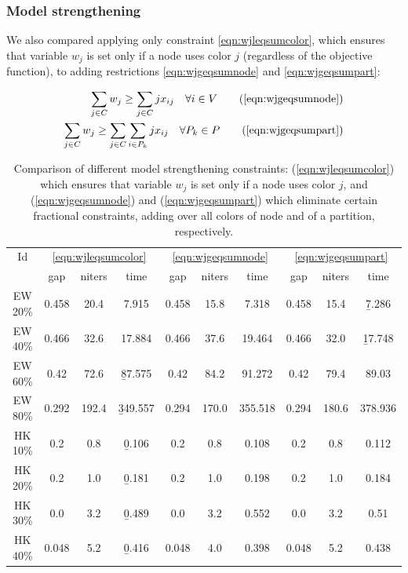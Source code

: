 \subsubsection{Model strengthening}

We also compared applying only constraint \ref{eqn:wjleqsumcolor}, which ensures that variable $w_j$ is set only if a node uses color $j$ (regardless of the objective function), to adding restrictions \ref{eqn:wjgeqsumnode} and \ref{eqn:wjgeqsumpart}:

\begin{align*}
\sum_{j \in C} w_j \geq \sum_{j \in C} j x_{ij} \quad \forall i \in V \tag{\ref{eqn:wjgeqsumnode}} \\
\sum_{j \in C} w_j \geq \sum_{j \in C} \sum_{i \in P_k} j x_{ij} \quad \forall P_k \in P \tag{\ref{eqn:wjgeqsumpart}}
\end{align*}

\begin{table}
\centering

\begin{tabular}{|c|ccc|ccc|ccc|}
\hline
\multicolumn{1}{|c|}{Id} & \multicolumn{3}{|c|}{\ref{eqn:wjleqsumcolor}} & \multicolumn{3}{|c|}{\ref{eqn:wjgeqsumnode}} & \multicolumn{3}{|c|}{\ref{eqn:wjgeqsumpart}}
\\
 & gap & niters & time & gap & niters & time & gap & niters & time
\\
\hline
EW 20\% & 0.458 & 20.4 & 7.915 & 0.458 & 15.8 & 7.318 & 0.458 & 15.4 & \b{7.286}
\\
EW 40\% & 0.466 & 32.6 & 17.884 & 0.466 & 37.6 & 19.464 & 0.466 & 32.0 & \b{17.748}
\\
EW 60\% & 0.42 & 72.6 & \b{87.575} & 0.42 & 84.2 & 91.272 & 0.42 & 79.4 & 89.03
\\
EW 80\% & 0.292 & 192.4 & \b{349.557} & 0.294 & 170.0 & 355.518 & 0.294 & 180.6 & 378.936
\\
\hline
HK 10\% &  0.2 &  0.8 & \b{0.106} &  0.2 &  0.8 & 0.108 &  0.2 &  0.8 & 0.112
\\
HK 20\% &  0.2 &  1.0 & \b{0.181} &  0.2 &  1.0 & 0.198 &  0.2 &  1.0 & 0.184
\\
HK 30\% &  0.0 &  3.2 & \b{0.489} &  0.0 &  3.2 & 0.552 &  0.0 &  3.2 & 0.51
\\
HK 40\% & 0.048 &  5.2 & \b{0.416} & 0.048 &  4.0 & 0.398 & 0.048 &  5.2 & 0.438
\\
\hline 
 \end{tabular}

\caption{Comparison of different model strengthening constraints: (\ref{eqn:wjleqsumcolor}) which ensures that variable $w_j$ is set only if a node uses color $j$, and (\ref{eqn:wjgeqsumnode}) and (\ref{eqn:wjgeqsumpart}) which eliminate certain fractional constraints, adding over all colors of node and of a partition, respectively.}

\label{table:models:colorbound}

\end{table}

